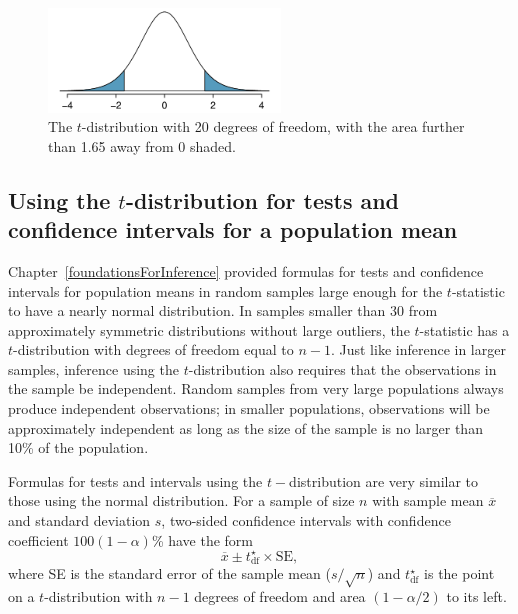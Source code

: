 \begin{figure}[h]
	\centering
	\includegraphics[width=0.55\textwidth]{ch_inference_for_means_oi_biostat/figures/tDistDF20RightTail1Point65/tDistDF20RightTail1Point65}
	\caption{The $t$-distribution with 20 degrees of freedom, with the area further than 1.65 away from 0 shaded.}
	\label{tDistDF20RightTail1Point65}
\end{figure}



\textD{\newpage}


\subsection{Using the $t$-distribution for tests and confidence intervals for a population mean}

\label{oneSampleTConfidenceIntervalsTests}


Chapter~\ref{foundationsForInference} provided formulas for tests and confidence intervals for population means in random samples large enough for the $t$-statistic to have a nearly normal distribution.  In samples smaller than 30 from approximately symmetric distributions without large outliers, the $t$-statistic has a $t$-distribution with degrees of freedom equal to $n - 1$. Just like inference in larger samples, inference using the $t$-distribution also requires that the observations in the sample be independent.  Random samples from very large populations always produce independent observations;  in smaller populations, observations will be approximately independent as long as the size of the sample is no larger than 10\% of the population.

Formulas for tests and intervals using the $t-$distribution are very similar to those using the normal distribution.  For a sample of size $n$ with sample mean $\overline{x}$ and standard deviation $s$, two-sided confidence intervals with confidence coefficient $100(1 - \alpha)$\% have the form
\[
    \overline{x} \pm t_{\text{df}}^{\star} \times \text{SE},
\]
where SE is the standard error of the sample mean ($s/\sqrt{n}$) and $t_{\text{df}}^{\star}$ is the point on a $t$-distribution with $n-1$ degrees of freedom and area $(1 - \alpha/2)$ to its left.

